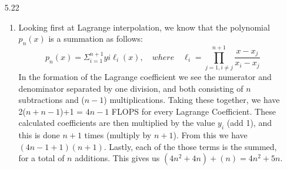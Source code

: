 \documentclass[11pt,a4paper]{article}
\begin{document}
\begin{itemize}
\begin{enumerate} [label={\alph*)}]
					\item At 11 AM the two interpolation functions give the following:
					$$\begin{array}{ccc} 
					Lagrange & & Natural Cubic Spline \\
					6.9913129e+01 & & 6.9881177e+01 \\
					69.9^{\circ} & & 69.8^{\circ}
					\end{array} $$
					\item At 1 AM the next day the two interpolation functions give the following:
					$$\begin{array}{ccc} 
					Lagrange & & Natural Cubic Spline \\
					1.5204891e+02 & & 5.8029609e+01 \\
					152.05^{\circ} & & 58.03^{\circ}
					\end{array} $$
					\item At 9 AM the next day the sun hides it face for shame at the blazing temperature Lagrange has unleashed upon the world:
					$$\begin{array}{ccc} 
					Lagrange & & Natural Cubic Spline \\
					4.5226229e+05 & & 0 \\
					452,262.29^{\circ} & & 0^{\circ}
					\end{array} $$
					Fun fact, this is about 1.8x hotter than the dead star at the center of the Red Spider Nebula $(\approx 250,000^{\circ})$ which itself is 25 times hotter than the surface of the sun. Here, however, we see that the cubic does not take a proportional dive to extreme lows and we can interpret this to show how Lagrange has a tendency to diverge drastically at the endpoints. The cubic dips down, yes, but handles the boundaries much better than the global interpolation polynomial using Lagrange.
				\end{enumerate}
				
			\item[5.22]
				\begin{enumerate} [label={\alph*)}]
					\item Looking first at Lagrange interpolation, we know that the polynomial $p_n(x)$ is a summation as follows:
					$$p_n(x) = \Sigma_{i=1}^{n+1} yi\ell_i(x), \quad where \quad \ell_i= \prod_{j=1,i \neq j}^{n+1} \frac{x-x_j}{x_i - x_j}$$
					In the formation of the Lagrange coefficient we see the numerator and denominator separated by one division, and both consisting of $n$ subtractions and ($n-1$) multiplications. Taking these together, we have 2($n+n-1$)+1 = $4n-1$ FLOPS for every Lagrange Coefficient. These calculated coefficients are then multiplied by the value $y_i$ (add 1), and this is done $n+1$ times (multiply by $n+1$). From this we have $(4n-1+1)(n+1)$. Lastly, each of the those terms is the summed, for a total of $n$ additions. This gives us $(4n^2+4n)+(n) = 4n^2+5n$. \\
					

\end{enumerate}
\end{itemize}
\end{document}
